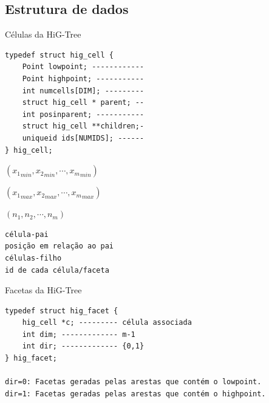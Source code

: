 \documentclass[../main/main.tex]{subfiles}
\begin{document}
\subsection{Estrutura de dados}
\begin{frame}[fragile]{Células da HiG-Tree}
    \begin{minipage}{0.45\textwidth}
        \begin{verbatim}
typedef struct hig_cell {
    Point lowpoint; ------------
    Point highpoint; -----------
    int numcells[DIM]; ---------
    struct hig_cell * parent; --
    int posinparent; -----------
    struct hig_cell **children;-
    uniqueid ids[NUMIDS]; ------
} hig_cell;
        \end{verbatim}
    \end{minipage}
    \hfill
    \begin{minipage}{0.45\textwidth}
        \vspace{-.1cm}
        $({x_1}_{min},{x_2}_{min},\cdots,{x_m}_{min})$

        $({x_1}_{max},{x_2}_{max},\cdots,{x_m}_{max})$

        $(n_1, n_2, \cdots, n_m)$
        \vspace{-.3cm}
        \begin{verbatim}
célula-pai
posição em relação ao pai
células-filho
id de cada célula/faceta
        \end{verbatim}

    \end{minipage}
\end{frame}

\begin{frame}[fragile]{Facetas da HiG-Tree}
    \begin{verbatim}
typedef struct hig_facet {
	hig_cell *c; --------- célula associada
	int dim; ------------- m-1
	int dir; ------------- {0,1}
} hig_facet;

dir=0: Facetas geradas pelas arestas que contém o lowpoint.
dir=1: Facetas geradas pelas arestas que contém o highpoint.
    \end{verbatim}

    \vspace{-0.5cm}
    \begin{center}
    \end{center}
\end{frame}
\end{document}
